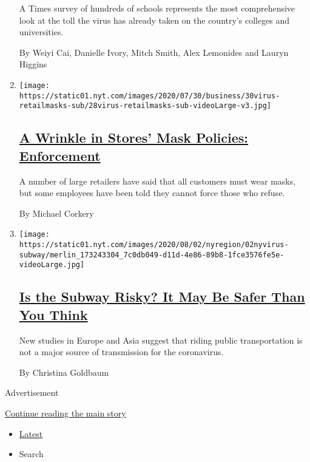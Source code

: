 \begin{enumerate}
  A Times survey of hundreds of schools represents the most
  comprehensive look at the toll the virus has already taken on the
  country's colleges and universities.

  By Weiyi Cai, Danielle Ivory, Mitch Smith, Alex Lemonides and Lauryn
  Higgins
\item
  \texttt{[image: https://static01.nyt.com/images/2020/07/30/business/30virus-retailmasks-sub/28virus-retailmasks-sub-videoLarge-v3.jpg]}

  \hypertarget{a-wrinkle-in-stores-mask-policies-enforcement}{%
  \subsection{\texorpdfstring{\href{/2020/07/29/business/coronavirus-masks-stores-walmart.html}{A
  Wrinkle in Stores' Mask Policies:
  Enforcement}}{A Wrinkle in Stores' Mask Policies: Enforcement}}\label{a-wrinkle-in-stores-mask-policies-enforcement}}

  A number of large retailers have said that all customers must wear
  masks, but some employees have been told they cannot force those who
  refuse.

  By Michael Corkery
\item
  \texttt{[image: https://static01.nyt.com/images/2020/08/02/nyregion/02nyvirus-subway/merlin\_173243304\_7c0db049-d11d-4e86-89b8-1fce3576fe5e-videoLarge.jpg]}

  \hypertarget{is-the-subway-risky-it-may-be-safer-than-you-think}{%
  \subsection{\texorpdfstring{\href{/2020/08/02/nyregion/nyc-subway-coronavirus-safety.html}{Is
  the Subway Risky? It May Be Safer Than You
  Think}}{Is the Subway Risky? It May Be Safer Than You Think}}\label{is-the-subway-risky-it-may-be-safer-than-you-think}}

  New studies in Europe and Asia suggest that riding public
  transportation is not a major source of transmission for the
  coronavirus.

  By Christina Goldbaum
\end{enumerate}

Advertisement

\protect\hyperlink{after-mid2}{Continue reading the main story}

\begin{itemize}
\tightlist
\item
  \protect\hyperlink{stream-panel}{Latest}
\item
  Search
\end{itemize}


